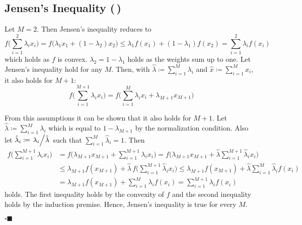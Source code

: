 \documentclass[11pt, a4paper]{scrartcl}
\newcommand{\qedeot}{\hfill\(\square\blacksquare\)}
\newcommand{\diffstar}{\texorpdfstring{\raisebox{-1pt}{\resizebox{!}{8pt}{\(\star\)}}}{*}}
\newcommand{\twostar}  {(\diffstar\,\diffstar)}
\begin{document}
		\subsection{Jensen's Inequality  \twostar}
			Let \( M = 2 \). Then Jensen's inequality reduces to
			\begin{equation}
				f\Bigg(\! \sum_{i = 1}^{2} \lambda_i x_i \!\Bigg)
					= f\big( \lambda_1 x_1 + (1 - \lambda_2) x_2 \big)
					\leq \lambda_1 f(x_1) + (1 - \lambda_1) f(x_2)
					= \sum_{i = 1}^{2} \lambda_i f(x_i)
			\end{equation}
			which holds as \(f\) is convex. \( \lambda_2 = 1 - \lambda_1 \) holds as the weights sum up to one. Let Jensen's inequality hold for any \(M\). Then, with \( \hat{\lambda} \coloneqq \sum_{i = 1}^{M} \lambda_i \) and \( \hat{x} \coloneqq \sum_{i = 1}^{M} x_i \), it also holds for \(M + 1\):
			\begin{equation}
				f\Bigg(\! \sum_{i = 1}^{M + 1} \lambda_i x_i \!\Bigg)
					= f\Bigg(\! \sum_{i = 1}^{M} \lambda_i x_i + \lambda_{M + 1} x_{M + 1} \!\Bigg)
			\end{equation}

			From this assumptions it can be shown that it also holds for \(M + 1\). Let \( \hat{\lambda} \coloneqq \sum_{i = 1}^{M} \lambda_i \) which is equal to \( 1 - \lambda_{M + 1} \) by the normalization condition. Also let \( \hat{\lambda}_i \coloneqq \flatfrac{\lambda_i}{\hat{\lambda}} \) such that \( \sum_{i = 1}^{M} \hat{\lambda}_i = 1 \). Then
			\begin{align}
				f\Big( \textstyle\sum_{i = 1}^{M + 1}\displaystyle \lambda_i x_i \Big)
					&= f\Big( \lambda_{M + 1} x_{M + 1} + \textstyle\sum_{i = 1}^{M + 1}\displaystyle \lambda_i x_i \Big)
					 = f\Big( \lambda_{M + 1} x_{M + 1} + \hat{\lambda} \textstyle\sum_{i = 1}^{M + 1}\displaystyle \hat{\lambda}_i x_i \Big) \\
					&\leq \lambda_{M + 1} f(x_{M + 1}) + \hat{\lambda} \, f\Big( \textstyle\sum_{i = 1}^{M + 1} \hat{\lambda}_i x_i \Big)
					 \leq \lambda_{M + 1} f(x_{M + 1}) + \hat{\lambda} \sum_{i = 1}^{M} \hat{\lambda}_i f(x_i) \\
					&= \lambda_{M + 1} f(x_{M + 1}) + \sum_{i = 1}^{M} \lambda_i f(x_i)
					 = \sum_{i = 1}^{M + 1} \lambda_i f(x_i)
			\end{align}
			holds. The first inequality holds by the convexity of \(f\) and the second inequality holds by the induction premise. Hence, Jensen's inequality is true for every \(M\).

			\qedeot
\end{document}
